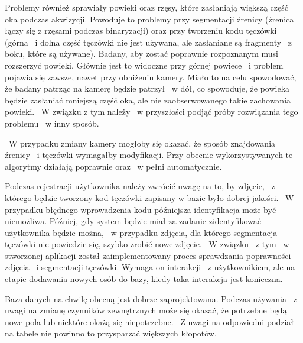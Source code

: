 Problemy również sprawiały powieki oraz rzęsy, które zasłaniają większą część oka podczas akwizycji. Powoduje to problemy przy segmentacji źrenicy (źrenica łączy się z rzęsami podczas binaryzacji) oraz przy tworzeniu kodu tęczówki (górna ~i dolna część tęczówki nie jest używana, ale zasłaniane są fragmenty ~z boku, które są używane). Badany, aby zostać poprawnie rozpoznanym musi rozszerzyć powieki. Głównie jest to widoczne przy górnej powiece ~i problem pojawia się zawsze, nawet przy obniżeniu kamery. Miało to na celu spowodować, że badany patrząc na kamerę będzie patrzył ~w dół, co spowoduje, że powieka będzie zasłaniać mniejszą część oka, ale nie zaobserwowanego takie zachowania powieki. ~W związku z tym należy ~w przyszłości podjąć próby rozwiązania tego problemu ~w inny sposób.

~W przypadku zmiany kamery mogłoby się okazać, że sposób znajdowania źrenicy ~i tęczówki wymagałby modyfikacji. Przy obecnie wykorzystywanych te algorytmy działają poprawnie oraz ~w pełni automatycznie.

Podczas rejestracji użytkownika należy zwrócić uwagę na to, by zdjęcie, ~z którego będzie tworzony kod tęczówki zapisany w bazie było dobrej jakości. ~W przypadku błędnego wprowadzenia kodu późniejsza identyfikacja może być niemożliwa. Później, gdy system będzie miał za zadanie zidentyfikować użytkownika będzie można, ~w przypadku zdjęcia, dla którego segmentacja tęczówki nie powiedzie się, szybko zrobić nowe zdjęcie. ~W związku ~z tym ~w stworzonej aplikacji został zaimplementowany proces sprawdzania poprawności zdjęcia ~i segmentacji tęczówki. Wymaga on interakcji ~z użytkownikiem, ale na etapie dodawania nowych osób do bazy, kiedy taka interakcja jest konieczna.

Baza danych na chwilę obecną jest dobrze zaprojektowana. Podczas używania ~z uwagi na zmianę czynników zewnętrznych może się okazać, że potrzebne będą nowe pola lub niektóre okażą się niepotrzebne. ~Z uwagi na odpowiedni podział na tabele nie powinno to przysparzać większych kłopotów.

